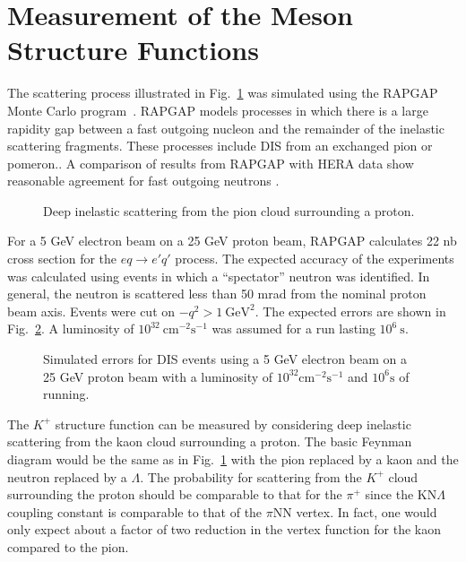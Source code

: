 \section*{Measurement of the Meson Structure Functions}

The scattering process illustrated in Fig.~\ref{fig4} was simulated
using the RAPGAP Monte Carlo program~\cite{jung}.  RAPGAP models
processes in which there is a large rapidity gap between a fast
outgoing nucleon and the remainder of the inelastic scattering
fragments.  These processes include DIS from an exchanged
pion\cite{pirner,holtmann,kopeliovich} or pomeron..  A comparison of
results from RAPGAP with HERA data show reasonable agreement for fast
outgoing neutrons \cite{adloff}.

\begin{figure}[b] %
\centerline{}
\vspace{10pt}

\caption{Deep inelastic scattering from the pion cloud surrounding a 
         proton.}

\label{fig4}
\end{figure}

For a 5 GeV electron beam on a 25 GeV proton beam, RAPGAP calculates
22 nb cross section for the $eq\rightarrow e'q'$ process.  The
expected accuracy of the experiments was calculated using events in
which a ``spectator'' neutron was identified.  In general, the neutron
is scattered less than 50 mrad from the nominal proton beam axis.
Events were cut on $-q^2 > 1~\textrm{GeV}^2$.  The expected errors are
shown in Fig.~\ref{errors}.  A luminosity of
$10^{32}~\textrm{cm}^{-2}\textrm{s}^{-1}$ was assumed for a run
lasting $10^6~\textrm{s}$.

\begin{figure} %
\centerline{}
\caption{Simulated errors for DIS events using a 5 GeV electron beam
         on a 25 GeV proton beam with a luminosity of
         $10^{32}\textrm{cm}^{-2}\textrm{s}^{-1}$ and $10^6\textrm{s}$
         of running.}
\label{errors}
\end{figure}   

The $K^+$ structure function can be measured by considering deep
inelastic scattering from the kaon cloud surrounding a proton.  The
basic Feynman diagram would be the same as in Fig.~\ref{fig4} with the
pion replaced by a kaon and the neutron replaced by a $\Lambda$.  The
probability for scattering from the $K^+$ cloud surrounding the proton
should be comparable to that for the $\pi^+$ since the KN$\Lambda$
coupling constant is comparable to that of the $\pi$NN vertex.  In
fact, one would only expect about a factor of two reduction in the
vertex function for the kaon compared to the pion.

